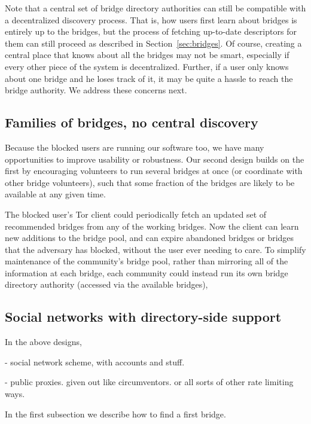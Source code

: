 \documentclass{llncs}
\begin{document}
Note that a central set of bridge directory authorities can still be
compatible with a decentralized discovery process. That is, how users
first learn about bridges is entirely up to the bridges, but the process
of fetching up-to-date descriptors for them can still proceed as described
in Section~\ref{sec:bridges}. Of course, creating a central place that
knows about all the bridges may not be smart, especially if every other
piece of the system is decentralized. Further, if a user only knows
about one bridge and he loses track of it, it may be quite a hassle to
reach the bridge authority. We address these concerns next.

\subsection{Families of bridges, no central discovery}

Because the blocked users are running our software too, we have many
opportunities to improve usability or robustness. Our second design builds
on the first by encouraging volunteers to run several bridges at once
(or coordinate with other bridge volunteers), such that some fraction
of the bridges are likely to be available at any given time.

The blocked user's Tor client could periodically fetch an updated set of
recommended bridges from any of the working bridges. Now the client can
learn new additions to the bridge pool, and can expire abandoned bridges
or bridges that the adversary has blocked, without the user ever needing
to care. To simplify maintenance of the community's bridge pool, rather
than mirroring all of the information at each bridge, each community
could instead run its own bridge directory authority (accessed via the
available bridges),

\subsection{Social networks with directory-side support}

In the above designs, 

- social network scheme, with accounts and stuff.



- public proxies. given out like circumventors. or all sorts of other rate limiting ways.




In the first subsection we describe how to find a first bridge.
\end{document}

